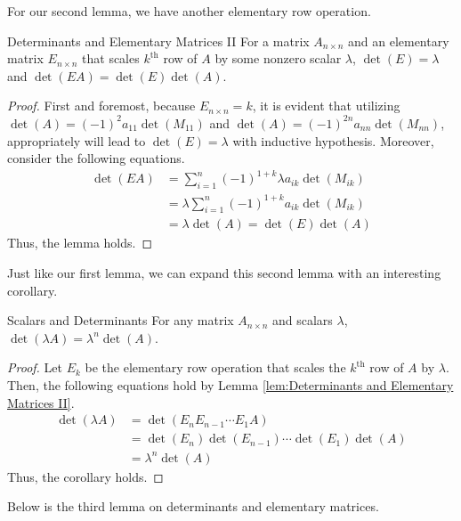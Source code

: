 \documentclass[../../main.tex]{subfiles}
\begin{document}
For our second lemma, we have another elementary row operation.

\begin{lemma}{}{Determinants and Elementary Matrices II}
For a matrix $A_{n \times n}$ and an elementary matrix
$E_{n \times n}$ that scales $k^\text{th}$ row of $A$ by some nonzero
scalar $\lambda$, $\det(E) = \lambda$ and $\det(EA) = \det(E)
\det(A)$.
\end{lemma}
\begin{proof}
First and foremost, because $E_{n \times n} = k$, it is evident
that utilizing $\det(A) = (-1)^2 a_{11} \det(M_{11})$ and $\det(A) =
(-1)^{2n} a_{nn} \det(M_{nn})$, appropriately will lead to $\det(E) =
\lambda$ with inductive hypothesis. Moreover, consider the following
equations.
\begin{align*}
    \det(EA)
    &= \sum_{i=1}^n (-1)^{1+k} \lambda a_{ik} \det(M_{ik}) \\
    &= \lambda \sum_{i=1}^n (-1)^{1+k} a_{ik} \det(M_{ik}) \\
    &= \lambda \det(A) = \det(E) \det(A)
\end{align*}
Thus, the lemma holds.
\end{proof}

Just like our first lemma, we can expand this second lemma with
an interesting corollary.

\begin{corollary}{}{Scalars and Determinants}
For any matrix $A_{n \times n}$ and scalars $\lambda$,
$\det(\lambda A) = \lambda^n \det(A)$.
\end{corollary}
\begin{proof}
Let $E_k$ be the elementary row operation that scales the
$k^\text{th}$ row of $A$ by $\lambda$. Then, the following equations
hold by Lemma \ref{lem:Determinants and Elementary Matrices II}.
\begin{align*}
    \det(\lambda A)
    &= \det( E_n E_{n-1} \cdots E_1 A) \\
    &= \det(E_n) \det(E_{n-1}) \cdots \det(E_1) \det(A) \\
    &= \lambda^n \det(A)
\end{align*}
Thus, the corollary holds.
\end{proof}

Below is the third lemma on determinants and elementary matrices.
\end{document}
